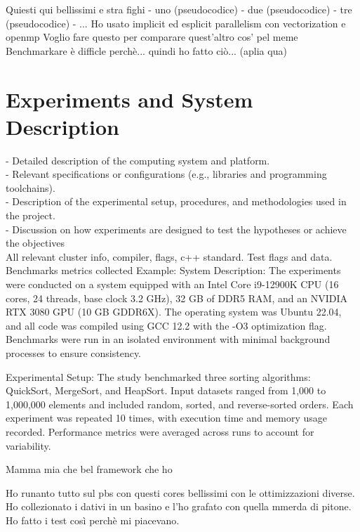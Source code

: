 \documentclass[conference]{IEEEtran}
\begin{document}
\iffalse
Remember: write
- what you did (contribution): high level overview like "hey, i want to test different vectorization ond parallelization implementations"
- how you did it (methodology): we benchmarked algorithm A ... (all the pseudocodes). Whay we mesured

\fi

Quiesti qui bellissimi e stra fighi
- uno (pseudocodice)
- due (pseudocodice)
- tre (pseudocodice)
- ...
Ho usato implicit ed esplicit parallelism con vectorization e openmp
Voglio fare questo per comparare quest'altro cos' pel meme
Benchmarkare è difficle perchè... quindi ho fatto ciò... (aplia qua)


\section{Experiments and System Description}

- Detailed description of the computing system and platform. \\
- Relevant specifications or configurations (e.g., libraries
and programming toolchains). \\
- Description of the experimental setup, procedures, and
methodologies used in the project. \\
- Discussion on how experiments are designed to test the hypotheses
or achieve the objectives \\


All relevant cluster info, compiler, flags, c++ standard. Test flags and data. Benchmarks metrics collected
Example:
System Description:
The experiments were conducted on a system equipped with an Intel Core i9-12900K CPU (16 cores, 24 threads, base clock 3.2 GHz), 32 GB of DDR5 RAM, and an NVIDIA RTX 3080 GPU (10 GB GDDR6X). The operating system was Ubuntu 22.04, and all code was compiled using GCC 12.2 with the -O3 optimization flag. Benchmarks were run in an isolated environment with minimal background processes to ensure consistency.

Experimental Setup:
The study benchmarked three sorting algorithms: QuickSort, MergeSort, and HeapSort. Input datasets ranged from 1,000 to 1,000,000 elements and included random, sorted, and reverse-sorted orders. Each experiment was repeated 10 times, with execution time and memory usage recorded. Performance metrics were averaged across runs to account for variability.

Mamma mia che bel framework che ho

Ho runanto tutto sul pbs con questi cores bellissimi con le ottimizzazioni diverse. Ho collezionato i dativi in un basino e l'ho grafato con quella mmerda di pitone. Ho fatto i test così perchè mi piacevano.
\end{document}
